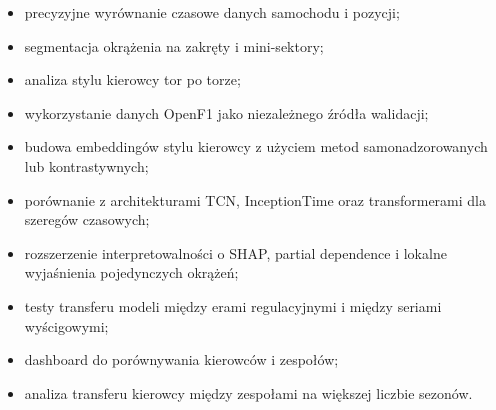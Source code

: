 \documentclass[printmode,pl]{mgr}
\begin{document}
\begin{itemize}
    \item precyzyjne wyrównanie czasowe danych samochodu i pozycji;
    \item segmentacja okrążenia na zakręty i mini-sektory;
    \item analiza stylu kierowcy tor po torze;
    \item wykorzystanie danych OpenF1 jako niezależnego źródła walidacji;
    \item budowa embeddingów stylu kierowcy z użyciem metod samonadzorowanych lub kontrastywnych;
    \item porównanie z architekturami TCN, InceptionTime oraz transformerami dla szeregów czasowych;
    \item rozszerzenie interpretowalności o SHAP, partial dependence i lokalne wyjaśnienia pojedynczych okrążeń;
    \item testy transferu modeli między erami regulacyjnymi i między seriami wyścigowymi;
    \item dashboard do porównywania kierowców i zespołów;
    \item analiza transferu kierowcy między zespołami na większej liczbie sezonów.
\end{itemize}

\cleardoublepage
\printbibliography[heading=bibintoc,title={Literatura}]

\end{document}
